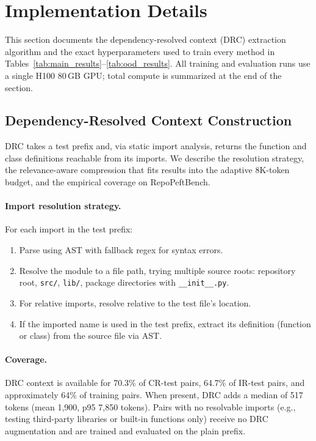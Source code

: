 \documentclass[11pt]{article}
\newcommand{\repopeftbench}{RepoPeftBench\xspace}
\begin{document}
\section{Implementation Details}
\label{app:implementation}

This section documents the dependency-resolved context (DRC) extraction algorithm and the exact hyperparameters used to train every method in Tables~\ref{tab:main_results}--\ref{tab:ood_results}.
All training and evaluation runs use a single H100 80\,GB GPU; total compute is summarized at the end of the section.

\subsection{Dependency-Resolved Context Construction}
\label{app:drc_construction}

DRC takes a test prefix and, via static import analysis, returns the function and class definitions reachable from its imports.
We describe the resolution strategy, the relevance-aware compression that fits results into the adaptive 8K-token budget, and the empirical coverage on \repopeftbench{}.

\paragraph{Import resolution strategy.}
For each import in the test prefix:
\begin{enumerate}[nosep]
\item Parse using AST with fallback regex for syntax errors.
\item Resolve the module to a file path, trying multiple source roots: repository root, \texttt{src/}, \texttt{lib/}, package directories with \texttt{\_\_init\_\_.py}.
\item For relative imports, resolve relative to the test file's location.
\item If the imported name is used in the test prefix, extract its definition (function or class) from the source file via AST.
\end{enumerate}

\paragraph{Coverage.}
DRC context is available for 70.3\% of CR-test pairs, 64.7\% of IR-test pairs, and approximately 64\% of training pairs.
When present, DRC adds a median of 517 tokens (mean 1,900, p95 7,850 tokens).
Pairs with no resolvable imports (e.g., testing third-party libraries or built-in functions only) receive no DRC augmentation and are trained and evaluated on the plain prefix.
\end{document}
